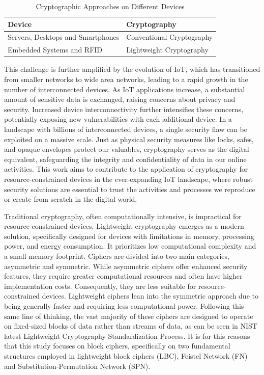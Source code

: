 \documentclass[conference]{IEEEtran}
\begin{document}
\begin{table}[ht]
  \centering
  \caption{Cryptographic Approaches on Different Devices\cite{IoT_1}}
  \begin{tabular}{ll}
    \toprule
    \textbf{Device} & \textbf{Cryptography} \\
    \midrule
    Servers, Desktops and Smartphones & Conventional Cryptography \\
    Embedded Systems and RFID & Lightweight Cryptography \\
    \bottomrule
  \end{tabular}
  \label{table:crypto_devices}
\end{table}

This challenge is further amplified by the evolution of IoT, which has transitioned from smaller networks to wide area networks, leading to a rapid growth in the number of interconnected devices. As IoT applications increase, a substantial amount of sensitive data is exchanged, raising concerns about privacy and security. Increased device interconnectivity further intensifies these concerns, potentially exposing new vulnerabilities with each additional device. In a landscape with billions of interconnected devices, a single security flaw can be exploited on a massive scale.
Just as physical security measures like locks, safes, and opaque envelopes protect our valuables, cryptography serves as the digital equivalent, safeguarding the integrity and confidentiality of data in our online activities. This work aims to contribute to the application of cryptography for resource-constrained devices in the ever-expanding IoT landscape, where robust security solutions are essential to trust the activities and processes we reproduce or create from scratch in the digital world. 

Traditional cryptography, often computationally intensive, is impractical for resource-constrained devices. Lightweight cryptography emerges as a modern solution, specifically designed for devices with limitations in memory, processing power, and energy consumption. It prioritizes low computational complexity and a small memory footprint\cite{zhong2024lightweight}. Ciphers are divided into two main categories, asymmetric and symmetric. While asymmetric ciphers offer enhanced security features, they require greater computational resources and often have higher implementation costs. Consequently, they are less suitable for resource-constrained devices. Lightweight ciphers lean into the symmetric approach due to being generally faster and requiring less computational power\cite{dworkin2001recommendation}. Following this same line of thinking, the vast majority of these ciphers are designed to operate on fixed-sized blocks of data rather than streams of data, as can be seen in NIST latest Lightweight Cryptography Standardization Process\cite{NIST}. It is for this reasons that this study focuses on block ciphers, specifically on two fundamental structures employed in lightweight block ciphers (LBC), Feistel Network (FN) and Substitution-Permutation Network (SPN).
\end{document}
